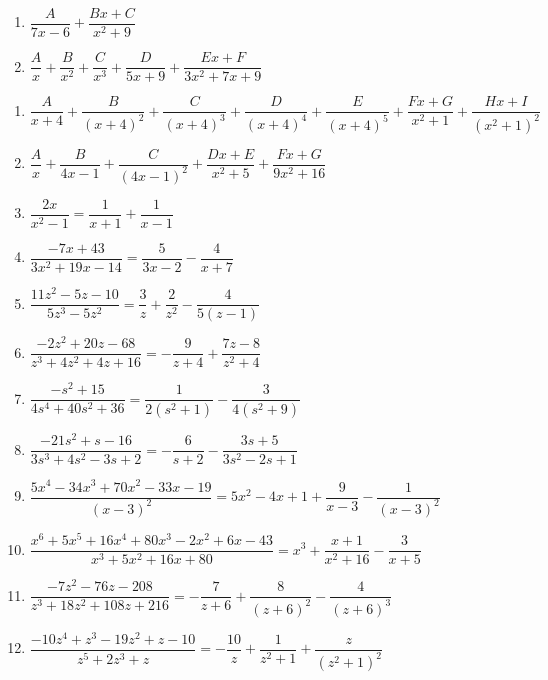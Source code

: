 \documentclass{ximera}
\begin{document}
\begin{multicols}{2}
\begin{enumerate}
\setcounter{enumi}{\value{HW}}

\item $\dfrac{A}{7x - 6} + \dfrac{Bx + C}{x^{2} + 9}$
\item $\dfrac{A}{x} + \dfrac{B}{x^{2}} + \dfrac{C}{x^{3}} + \dfrac{D}{5x + 9} + \dfrac{Ex + F}{3x^{2} + 7x + 9}$

\setcounter{HW}{\value{enumi}}
\end{enumerate}
\end{multicols}

\begin{enumerate}
\setcounter{enumi}{\value{HW}}

\item $\dfrac{A}{x + 4} + \dfrac{B}{(x + 4)^{2}} + \dfrac{C}{(x + 4)^{3}} + \dfrac{D}{(x + 4)^{4}} + \dfrac{E}{(x + 4)^{5}} + \dfrac{Fx + G}{x^{2} + 1} + \dfrac{Hx + I}{(x^{2} + 1)^{2}}$
\item $\dfrac{A}{x} + \dfrac{B}{4x - 1} + \dfrac{C}{(4x - 1)^{2}} + \dfrac{Dx + E}{x^{2} + 5} + \dfrac{Fx + G}{9x^{2} + 16}$


\item $\dfrac{2x}{x^{2} - 1} = \dfrac{1}{x + 1} + \dfrac{1}{x - 1}$
\item $\dfrac{-7x + 43}{3x^{2} + 19x - 14}= \dfrac{5}{3x - 2} - \dfrac{4}{x + 7}$


\item $\dfrac{11z^{2} - 5z - 10}{5z^{3} - 5z^{2}} = \dfrac{3}{z} + \dfrac{2}{z^{2}} - \dfrac{4}{5(z - 1)}$
\item $\dfrac{-2z^{2} + 20z - 68}{z^{3} + 4z^{2} + 4z + 16} = -\dfrac{9}{z + 4} + \dfrac{7z - 8}{z^{2} + 4}$


\item $\dfrac{-s^{2} + 15}{4s^{4} + 40s^{2} + 36} = \dfrac{1}{2(s^{2} + 1)} - \dfrac{3}{4(s^{2} + 9)}$
\item $\dfrac{-21s^{2} + s - 16}{3s^{3} + 4s^{2} - 3s + 2} = -\dfrac{6}{s + 2} - \dfrac{3s + 5}{3s^{2} - 2s + 1}$


\item $\dfrac{5x^{4} - 34x^{3} + 70x^{2} - 33x - 19}{(x - 3)^{2}} = 5x^{2} - 4x + 1 + \dfrac{9}{x - 3} - \dfrac{1}{(x - 3)^{2}}$
\item $\dfrac{x^{6} + 5x^{5} + 16x^{4} + 80x^{3} - 2x^{2} + 6x - 43}{x^{3} + 5x^{2} + 16x + 80} = x^{3} + \dfrac{x + 1}{x^{2} + 16} - \dfrac{3}{x + 5}$


\item $\dfrac{-7z^{2} - 76z - 208}{z^{3} + 18z^{2} + 108z + 216} = -\dfrac{7}{z + 6} + \dfrac{8}{(z + 6)^{2}} - \dfrac{4}{(z + 6)^{3}}$
\item $\dfrac{-10z^{4} + z^{3} - 19z^{2} + z - 10}{z^{5} + 2z^{3} + z} = -\dfrac{10}{z} + \dfrac{1}{z^{2} + 1} + \dfrac{z}{(z^{2} + 1)^{2}}$



\end{enumerate}
\end{document}
